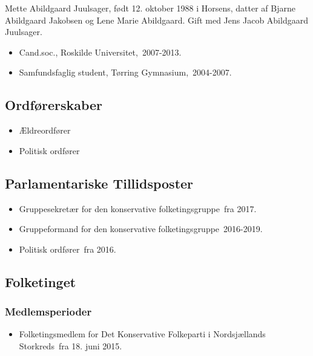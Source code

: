\documentclass[11pt, a4paper]{awesome-cv}
\begin{document}
\makecvheader[R]
\makelettertitle
\begin{cvletter}
Mette Abildgaard Juulsager, født 12. oktober 1988 i Horsens, datter af Bjarne Abildgaard Jakobsen og Lene Marie Abildgaard. Gift med Jens Jacob Abildgaard Juulsager.

\begin{itemize}
\item Cand.soc., Roskilde Universitet, 2007-2013.
\item Samfundsfaglig student, Tørring Gymnasium, 2004-2007.
\end{itemize}
\subsection*{Ordførerskaber}
\begin{itemize}
\item Ældreordfører
\item Politisk ordfører
\end{itemize}
\subsection*{Parlamentariske Tillidsposter}
\begin{itemize}
\item Gruppesekretær for den konservative folketingsgruppe fra 2017.
\item Gruppeformand for den konservative folketingsgruppe 2016-2019.
\item Politisk ordfører fra 2016.
\end{itemize}
\subsection*{Folketinget}
\subsubsection*{Medlemsperioder}
\begin{itemize}
\item Folketingsmedlem for Det Konservative Folkeparti i Nordsjællands Storkreds fra 18. juni 2015.
\end{itemize}

\end{cvletter}
\end{document}
